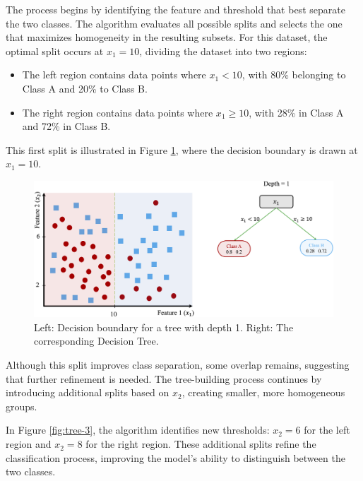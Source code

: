 \documentclass[
  11pt,
]{book}
\providecommand{\tightlist}{%
  \setlength{\itemsep}{0pt}\setlength{\parskip}{0pt}}
\theoremstyle{definition}
\theoremstyle{definition}
\theoremstyle{definition}
\theoremstyle{definition}
\theoremstyle{remark}
\begin{document}
The process begins by identifying the feature and threshold that best separate the two classes. The algorithm evaluates all possible splits and selects the one that maximizes homogeneity in the resulting subsets. For this dataset, the optimal split occurs at \(x_1 = 10\), dividing the dataset into two regions:

\begin{itemize}
\tightlist
\item
  The left region contains data points where \(x_1 < 10\), with 80\% belonging to Class A and 20\% to Class B.
\item
  The right region contains data points where \(x_1 \geq 10\), with 28\% in Class A and 72\% in Class B.
\end{itemize}

This first split is illustrated in Figure \ref{fig:tree-2}, where the decision boundary is drawn at \(x_1 = 10\).

\begin{figure}[H]

{\centering \includegraphics[width=1\linewidth]{images/ch11_ex_tree_2} 

}

\caption{Left: Decision boundary for a tree with depth 1. Right: The corresponding Decision Tree.}\label{fig:tree-2}
\end{figure}

Although this split improves class separation, some overlap remains, suggesting that further refinement is needed. The tree-building process continues by introducing additional splits based on \(x_2\), creating smaller, more homogeneous groups.

In Figure \ref{fig:tree-3}, the algorithm identifies new thresholds: \(x_2 = 6\) for the left region and \(x_2 = 8\) for the right region. These additional splits refine the classification process, improving the model's ability to distinguish between the two classes.
\end{document}
